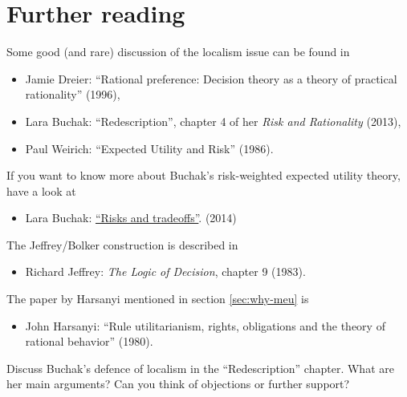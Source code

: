 \section{Further reading}

Some good (and rare) discussion of the localism issue can be found in

\begin{itemize}
\item Jamie Dreier: ``Rational preference: Decision theory as a theory of practical rationality'' (1996), 
\item Lara Buchak: ``Redescription'', chapter 4 of her \emph{Risk and Rationality} (2013),
\item Paul Weirich: ``Expected Utility and Risk'' (1986).
\end{itemize}
%
If you want to know more about Buchak's risk-weighted expected utility
theory, have a look at

\begin{itemize}
\item Lara Buchak: \href{https://philosophy.berkeley.edu/file/754/Buchak_Risk_and_Tradeoffs.pdf}{``Risks and tradeoffs''}. (2014)
\end{itemize}

The Jeffrey/Bolker construction is described in
\begin{itemize}
\item Richard Jeffrey: \emph{The Logic of Decision}, chapter 9 (1983).
\end{itemize}

The paper by Harsanyi mentioned in section \ref{sec:why-meu} is
\begin{itemize}
\item John Harsanyi: ``Rule utilitarianism, rights, obligations and the theory of rational behavior'' (1980).
\end{itemize}

\begin{essay}
  Discuss Buchak's defence of localism in the ``Redescription''
  chapter. What are her main arguments? Can you think of objections or
  further support?
\end{essay}

